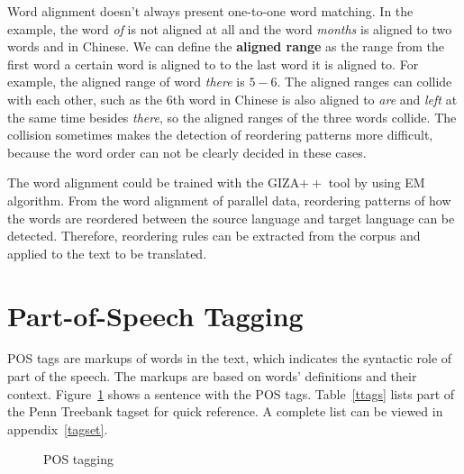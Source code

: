 \label{alignedrange}
Word alignment doesn't always present one-to-one word matching. In the example, the word \emph{of} is not aligned at all and the word \emph{months} is aligned to two words  and  in Chinese. We can define the \textbf{aligned range} as the range from the first word a certain word is aligned to to the last word it is aligned to. For example, the aligned range of word \emph{there} is $5-6$. The aligned ranges can collide with each other, such as the $6$th word  in Chinese is also aligned to \emph{are} and \emph{left} at the same time besides \emph{there}, so the aligned ranges of the three words collide. The collision sometimes makes the detection of reordering patterns more difficult, because the word order can not be clearly decided in these cases.

The word alignment could be trained with the GIZA$++$ tool by using \ac{EM} algorithm. From the word alignment of parallel data, reordering patterns of how the words are reordered between the source language and target language can be detected. Therefore, reordering rules can be extracted from the corpus and applied to the text to be translated.

\section{Part-of-Speech Tagging}

\acf{POS} tags are markups of words in the text, which indicates the syntactic role of part of the speech. The markups are based on words' definitions and their context. Figure~\ref{tags} shows a sentence with the POS tags. Table~\ref{ttags} lists part of the Penn Treebank tagset for quick reference. A complete list can be viewed in appendix~\ref{tagset}.

\begin{figure}[H]

\centering

\caption{POS tagging}
\label{tags}
\end{figure}

